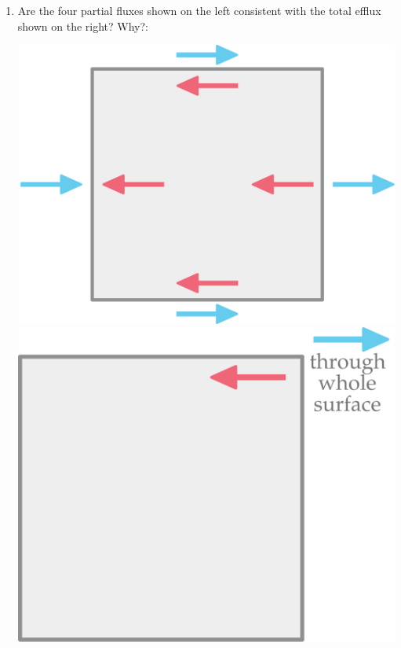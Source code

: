 \documentclass[a4paper,12pt,%
onecolumn,oneside,titlepage,%
british%
]{memoir}
\renewcommand*{\|}[1][]{\nonscript\:#1\vert\nonscript\:\mathopen{}}
\begin{document}
\begin{exercise}
  \begin{enumerate}[para,label=\bfseries\arabic*.]
  \item Are the four partial fluxes shown on the left consistent with the total efflux shown on the right? Why?:
    \begin{center}
  \hspace*{\fill}
  \includegraphics[align=t,scale=0.08]{flux_square.pdf}
  \hfill
  \includegraphics[align=t,scale=0.08]{flux_square_sum.pdf}
  \hspace*{\fill}
\end{center}


\end{enumerate}
\end{exercise}
\end{document}
